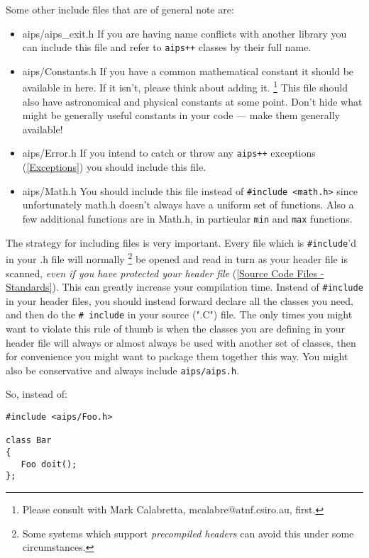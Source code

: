 Some other include files that are of general note are:
\begin{itemize}
\item aips/aips\_exit.h
If you are having name conflicts with another library you can include
this file and refer to {\tt aips++} classes by their full name.
\item aips/Constants.h
If you have a common mathematical constant it should be available in
here. If it isn't, please think about adding it. \footnote{Please consult
with Mark Calabretta, mcalabre@atnf.csiro.au, first.} This file should
also have astronomical and physical constants at some point. Don't hide
what might be generally useful constants in your code --- make them
generally available!
\item aips/Error.h
If you intend to catch or throw any {\tt aips++} exceptions (\ref{Exceptions})
you should include this file.
\item aips/Math.h
You should include this file instead of {\tt \#include <math.h>} since
unfortunately math.h doesn't always have a uniform set of functions.
Also a few additional functions are in Math.h, in particular {\tt min}
and {\tt max} functions.
\end{itemize}

The strategy for including files is very important. Every file which is
{\tt \#include}'d in your .h file will normally 
\footnote{Some systems which support {\em precompiled headers} can avoid
this under some circumstances.} be opened and read in turn as your header
file is scanned, {\em even if you have protected your header file}
(\ref{Source Code Files - Standards}).
This can greatly increase your compilation time.
Instead of {\tt \#include} in your header files, you should instead
forward declare all the classes you need, and then do the {\tt \#
include} in your source (".C") file. The only times you might want to
violate this rule of thumb is when the classes you are defining in your
header file will always or almost always be used with another set of
classes, then for convenience you might want to package them together
this way. You might also be conservative and always include
{\tt aips/aips.h}.

So, instead of:
\begin{verbatim}
#include <aips/Foo.h>

class Bar
{
   Foo doit();
};
\end{verbatim}

